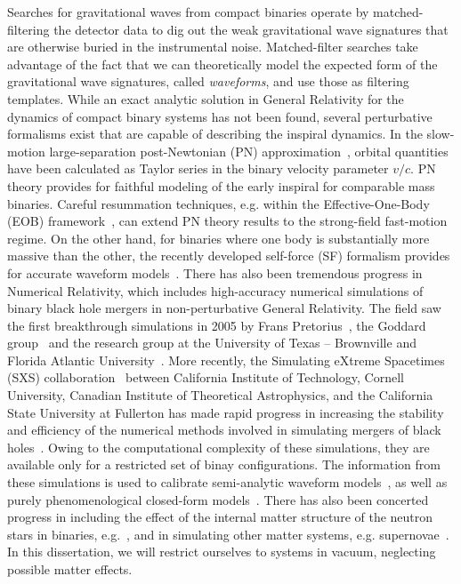 Searches for gravitational waves from compact binaries operate by 
matched-filtering the detector data to dig out the weak gravitational wave
signatures that are otherwise buried in the instrumental noise. 
Matched-filter searches take
advantage of the fact that we can theoretically model the expected form of the 
gravitational wave signatures, called \textit{waveforms}, and use those 
as filtering templates. While an exact analytic solution in General Relativity
for the dynamics of compact binary systems has not been found, several perturbative
formalisms exist that are capable of describing the inspiral dynamics.
In the slow-motion large-separation post-Newtonian (PN) 
approximation~\cite{PNtheoryLivingReviewBlanchet}, orbital quantities have 
been calculated as Taylor series in the binary 
velocity parameter $v/c$. PN theory provides for faithful modeling of the 
early inspiral for comparable mass binaries. 
Careful resummation techniques, e.g. within the Effective-One-Body
(EOB) framework~\cite{EOBOriginalBuonannoDamour}, can extend PN theory 
results to the strong-field fast-motion regime.
On the other hand, for binaries where one body is substantially more massive
than the other, the recently developed self-force (SF) formalism provides for
accurate waveform models~\cite{grallaI,grallaII}. 
% 
There has also been tremendous progress in Numerical Relativity, which 
includes high-accuracy numerical simulations of binary black
hole mergers in non-perturbative General Relativity. The field saw the first
breakthrough simulations in 2005 by Frans Pretorius~\cite{Pretorius2005,
Pretorius2006}, the Goddard group~\cite{Campanelli:2005dd} and the research
group at the University of Texas -- Brownville and Florida Atlantic 
University~\cite{Campanelli:2005dd}. More recently, the Simulating eXtreme
Spacetimes (SXS) collaboration~\cite{SXSWebsite} between California Institute
of Technology, Cornell University, Canadian Institute of Theoretical 
Astrophysics, and the California State University at Fullerton has made rapid
progress in increasing the stability and efficiency of the numerical 
methods involved in simulating mergers of black holes~\cite{Mroue:2013xna}.
Owing to the computational complexity of these simulations, they are available 
only for a restricted set of binay configurations. 
The information from these simulations is used to calibrate
semi-analytic waveform models~\cite{BuonannoEOBv2Main}, as well as purely
phenomenological closed-form models~\cite{Santamaria:2010yb}. 
There has also been concerted progress in including the effect of the 
internal matter structure of the neutron stars in binaries, 
e.g.~\cite{Deaton:2013sla}, and in simulating other matter systems,
e.g. supernovae~\cite{Mosta:2014jaa}.
In this dissertation, we will restrict ourselves to systems in vacuum, 
neglecting possible matter effects. 

